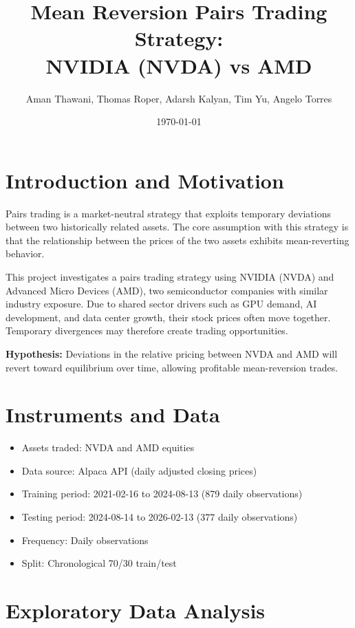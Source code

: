 \documentclass[11pt]{article}
\title{Mean Reversion Pairs Trading Strategy:\\
NVIDIA (NVDA) vs AMD}
\author{Aman Thawani, Thomas Roper, Adarsh Kalyan, Tim Yu, Angelo Torres}
\date{\today}
\begin{document}
\maketitle

\tableofcontents
\newpage

\section{Introduction and Motivation}

Pairs trading is a market-neutral strategy that exploits temporary deviations 
between two historically related assets. The core assumption with this strategy is that the  
relationship between the prices of the two assets exhibits mean-reverting behavior.

This project investigates a pairs trading strategy using NVIDIA (NVDA) and 
Advanced Micro Devices (AMD), two semiconductor companies with similar industry 
exposure. Due to shared sector drivers such as GPU demand, AI development, and 
data center growth, their stock prices often move together. Temporary divergences 
may therefore create trading opportunities.

\textbf{Hypothesis:} Deviations in the relative pricing between NVDA and AMD will 
revert toward equilibrium over time, allowing profitable mean-reversion trades.

\section{Instruments and Data}

\begin{itemize}
\item Assets traded: NVDA and AMD equities
\item Data source: Alpaca API (daily adjusted closing prices)
\item Training period: 2021-02-16 to 2024-08-13 (879 daily observations)
\item Testing period: 2024-08-14 to 2026-02-13 (377 daily observations)
\item Frequency: Daily observations
\item Split: Chronological 70/30 train/test
\end{itemize}

\section{Exploratory Data Analysis}
\end{document}
